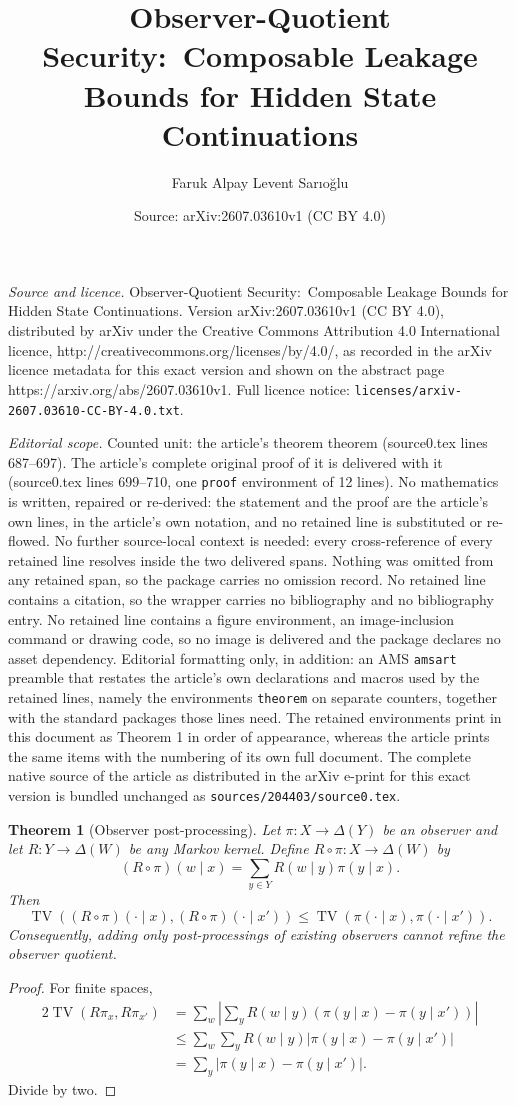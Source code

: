 \documentclass[10pt,a4paper]{amsart}
\title{Observer-Quotient Security:\ Composable Leakage Bounds for Hidden State Continuations}
\author{Faruk Alpay \quad Levent Sar{\i}o\u{g}lu}
\date{Source: arXiv:2607.03610v1 (CC BY 4.0)}
\newtheorem{theorem}{Theorem}
\newcommand{\DeltaS}{\Delta}
\DeclareMathOperator{\TV}{TV}
\begin{document}
\maketitle

\noindent\emph{Source and licence.} Observer-Quotient Security:\ Composable Leakage Bounds for Hidden State Continuations. Version arXiv:2607.03610v1 (CC BY 4.0), distributed by arXiv under the Creative Commons Attribution 4.0 International licence, http://creativecommons.org/licenses/by/4.0/, as recorded in the arXiv licence metadata for this exact version and shown on the abstract page https://arxiv.org/abs/2607.03610v1. Full licence notice: \texttt{licenses/arxiv-2607.03610-CC-BY-4.0.txt}.\par\smallskip

\noindent\textit{Editorial scope.} Counted unit: the article's theorem theorem (source0.tex lines 687--697). The article's complete original proof of it is delivered with it (source0.tex lines 699--710, one \texttt{proof} environment of 12 lines). No mathematics is written, repaired or re-derived: the statement and the proof are the article's own lines, in the article's own notation, and no retained line is substituted or re-flowed.  No further source-local context is needed: every cross-reference of every retained line resolves inside the two delivered spans.  Nothing was omitted from any retained span, so the package carries no omission record.  No retained line contains a citation, so the wrapper carries no bibliography and no bibliography entry.  No retained line contains a figure environment, an image-inclusion command or drawing code, so no image is delivered and the package declares no asset dependency.  Editorial formatting only, in addition: an AMS \texttt{amsart} preamble that restates the article's own declarations and macros used by the retained lines, namely the environments \texttt{theorem} on separate counters, together with the standard packages those lines need.  The retained environments print in this document as Theorem 1 in order of appearance, whereas the article prints the same items with the numbering of its own full document.  The complete native source of the article as distributed in the arXiv e-print for this exact version is bundled unchanged as \texttt{sources/204403/source0.tex}.
\begin{theorem}[Observer post-processing]
Let $\pi:X\to\DeltaS(Y)$ be an observer and let $R:Y\to\DeltaS(W)$ be any Markov kernel. Define $R\circ\pi:X\to\DeltaS(W)$ by
\[
    (R\circ\pi)(w\mid x)=\sum_{y\in Y}R(w\mid y)\pi(y\mid x).
\]
Then
\[
    \TV((R\circ\pi)(\cdot\mid x),(R\circ\pi)(\cdot\mid x'))\le \TV(\pi(\cdot\mid x),\pi(\cdot\mid x')).
\]
Consequently, adding only post-processings of existing observers cannot refine the observer quotient.
\end{theorem}

\begin{proof}
For finite spaces,
\[
\begin{aligned}
2\TV(R\pi_x,R\pi_{x'})
&=\sum_w\left|\sum_y R(w\mid y)(\pi(y\mid x)-\pi(y\mid x'))\right|\\
&\le \sum_w\sum_y R(w\mid y)|\pi(y\mid x)-\pi(y\mid x')|\\
&=\sum_y |\pi(y\mid x)-\pi(y\mid x')|.
\end{aligned}
\]
Divide by two.
\end{proof}
\end{document}
